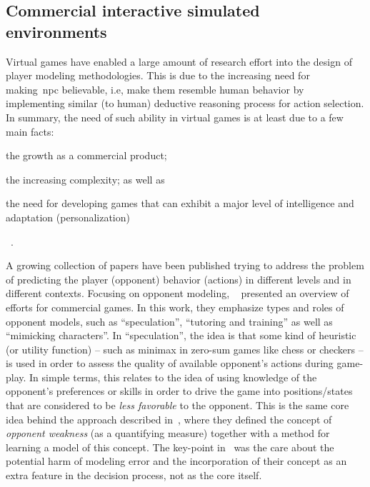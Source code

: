 
\subsection{Commercial interactive simulated environments}

Virtual games have enabled a large amount of research effort into the design of player modeling methodologies. This is due to the increasing need for making~\gls{npc} believable, i.e, make them resemble human behavior by implementing similar (to human) deductive reasoning process for action selection. In summary, the need of such ability in virtual games is at least due to a few main facts: \begin{inparaenum}\item the growth as a commercial product; \item the increasing complexity; as well as \item the need for developing games that can exhibit a major level of intelligence and adaptation (personalization)\end{inparaenum}~\citep{bakkes_personalised_2012}. 

A growing collection of papers have been published trying to address the problem of predicting the player (opponent) behavior (actions) in different levels and in different contexts. Focusing on opponent modeling, ~\cite{herik_opponent_2005} presented an overview of efforts for commercial games. In this work, they emphasize types and roles of opponent models, such as ``speculation'', ``tutoring and training'' as well as ``mimicking characters''. In ``speculation'', the idea is that some kind of heuristic (or utility function) -- such as minimax in zero-sum games like chess or checkers -- is used in order to assess the quality of available opponent's actions during game-play. In simple terms, this relates to the idea of using knowledge of the opponent's preferences or skills in order to drive the game into positions/states that are considered to be \textit{less favorable} to the opponent. This is the same core idea behind the approach described in~\cite{markovitch_learning_2005}, where they defined the concept of \textit{opponent weakness} (as a quantifying measure) together with a method for learning a model of this concept. The key-point in~\cite{markovitch_learning_2005} was the care about the potential harm of modeling error and the incorporation of their concept as an extra feature in the decision process, not as the core itself.

